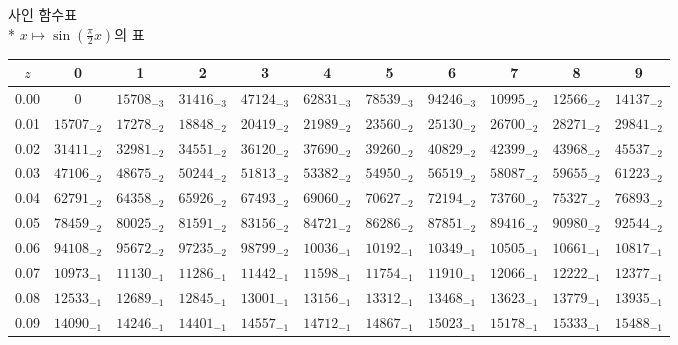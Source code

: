 \documentclass[10pt, a4paper]{article}
\begin{document}
\begin{center}
    \huge{사인 함수표}\normalsize\\
    * \(x \longmapsto \sin\left(\frac{\pi}{2}x\right)\)의 표
    \begin{longtable}{c || c c c c c | c c c c c}
        \(z\) & 0 & 1 & 2 & 3 & 4 & 5 & 6 & 7 & 8 & 9\\
        \hline\hline
        0.00 & \({0}\) & \({15708}_{-3}\) & \({31416}_{-3}\) & \({47124}_{-3}\) & \({62831}_{-3}\) & \({78539}_{-3}\) & \({94246}_{-3}\) & \({10995}_{-2}\) & \({12566}_{-2}\) & \({14137}_{-2}\)\\
        0.01 & \({15707}_{-2}\) & \({17278}_{-2}\) & \({18848}_{-2}\) & \({20419}_{-2}\) & \({21989}_{-2}\) & \({23560}_{-2}\) & \({25130}_{-2}\) & \({26700}_{-2}\) & \({28271}_{-2}\) & \({29841}_{-2}\)\\
        0.02 & \({31411}_{-2}\) & \({32981}_{-2}\) & \({34551}_{-2}\) & \({36120}_{-2}\) & \({37690}_{-2}\) & \({39260}_{-2}\) & \({40829}_{-2}\) & \({42399}_{-2}\) & \({43968}_{-2}\) & \({45537}_{-2}\)\\
        0.03 & \({47106}_{-2}\) & \({48675}_{-2}\) & \({50244}_{-2}\) & \({51813}_{-2}\) & \({53382}_{-2}\) & \({54950}_{-2}\) & \({56519}_{-2}\) & \({58087}_{-2}\) & \({59655}_{-2}\) & \({61223}_{-2}\)\\
        0.04 & \({62791}_{-2}\) & \({64358}_{-2}\) & \({65926}_{-2}\) & \({67493}_{-2}\) & \({69060}_{-2}\) & \({70627}_{-2}\) & \({72194}_{-2}\) & \({73760}_{-2}\) & \({75327}_{-2}\) & \({76893}_{-2}\)\\
        0.05 & \({78459}_{-2}\) & \({80025}_{-2}\) & \({81591}_{-2}\) & \({83156}_{-2}\) & \({84721}_{-2}\) & \({86286}_{-2}\) & \({87851}_{-2}\) & \({89416}_{-2}\) & \({90980}_{-2}\) & \({92544}_{-2}\)\\
        0.06 & \({94108}_{-2}\) & \({95672}_{-2}\) & \({97235}_{-2}\) & \({98799}_{-2}\) & \({10036}_{-1}\) & \({10192}_{-1}\) & \({10349}_{-1}\) & \({10505}_{-1}\) & \({10661}_{-1}\) & \({10817}_{-1}\)\\
        0.07 & \({10973}_{-1}\) & \({11130}_{-1}\) & \({11286}_{-1}\) & \({11442}_{-1}\) & \({11598}_{-1}\) & \({11754}_{-1}\) & \({11910}_{-1}\) & \({12066}_{-1}\) & \({12222}_{-1}\) & \({12377}_{-1}\)\\
        0.08 & \({12533}_{-1}\) & \({12689}_{-1}\) & \({12845}_{-1}\) & \({13001}_{-1}\) & \({13156}_{-1}\) & \({13312}_{-1}\) & \({13468}_{-1}\) & \({13623}_{-1}\) & \({13779}_{-1}\) & \({13935}_{-1}\)\\
        0.09 & \({14090}_{-1}\) & \({14246}_{-1}\) & \({14401}_{-1}\) & \({14557}_{-1}\) & \({14712}_{-1}\) & \({14867}_{-1}\) & \({15023}_{-1}\) & \({15178}_{-1}\) & \({15333}_{-1}\) & \({15488}_{-1}\)\\

\end{longtable}
\end{center}
\end{document}
